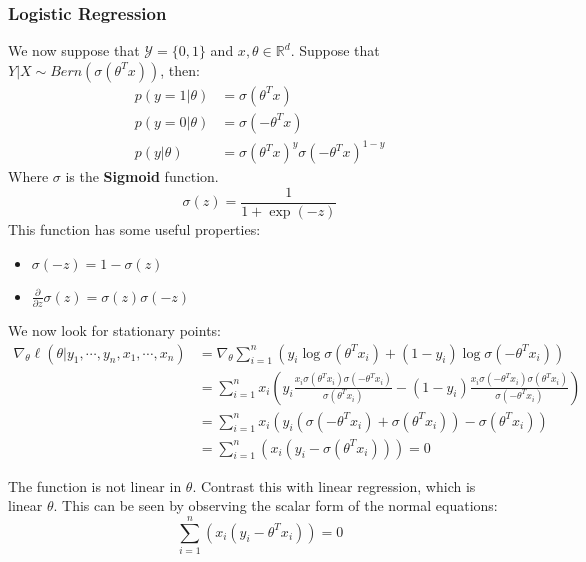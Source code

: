 \documentclass[]{article}
\theoremstyle{mattstyle}
\theoremstyle{definition}
\begin{document}
\subsubsection{Logistic Regression}

We now suppose that $\mathcal{Y} = \{0,1\}$ and $x,\theta \in \mathbb{R}^d$. Suppose that $Y|X \sim Bern(\sigma(\theta^Tx))$, then:
\begin{align*}
p(y=1|\theta) &= \sigma(\theta^Tx)\\
p(y=0|\theta) &= \sigma(-\theta^Tx)\\
p(y|\theta) &= \sigma(\theta^Tx)^y\sigma(-\theta^Tx)^{1-y}
\end{align*}
Where $\sigma$ is the \textbf{Sigmoid} function. 
$$\sigma(z) = \frac{1}{1+\exp(-z)}$$
This function has some useful properties:
\begin{itemize}
	\item $\sigma(-z) = 1-\sigma(z)$
	\item $ \frac{\partial}{\partial z}\sigma(z) = \sigma(z)\sigma(-z)$
\end{itemize}
We now look for stationary points:
\begin{align*}
\nabla_{\theta} \ell(\theta |y_1, \cdots, y_n, x_1, \cdots, x_n) &= \nabla_{\theta}\sum_{i=1}^n\left(y_i \log \sigma(\theta^Tx_i) + (1-y_i)\log \sigma(-\theta^Tx_i) \right)\\
&= \sum_{i=1}^n x_i\left( y_i \frac{x_i\sigma(\theta^Tx_i)\sigma(-\theta^Tx_i)}{\sigma(\theta^Tx_i)} -(1-y_i) \frac{x_i\sigma(-\theta^Tx_i)\sigma(\theta^Tx_i)}{\sigma(-\theta^Tx_i)}\right)\\
&=\sum_{i=1}^n x_i\left( y_i\left(\sigma(-\theta^Tx_i) + \sigma(\theta^Tx_i)\right) - \sigma(\theta^Tx_i) \right)\\
&=\sum_{i=1}^n\left( x_i(y_i - \sigma(\theta^Tx_i)) \right)=0
\end{align*}

The function is not linear in $\theta$. Contrast this with linear regression, which is linear $\theta$. This can be seen by observing the scalar form of the normal equations:
$$\sum_{i=1}^n\left( x_i(y_i - \theta^Tx_i) \right)=0$$
\end{document}
